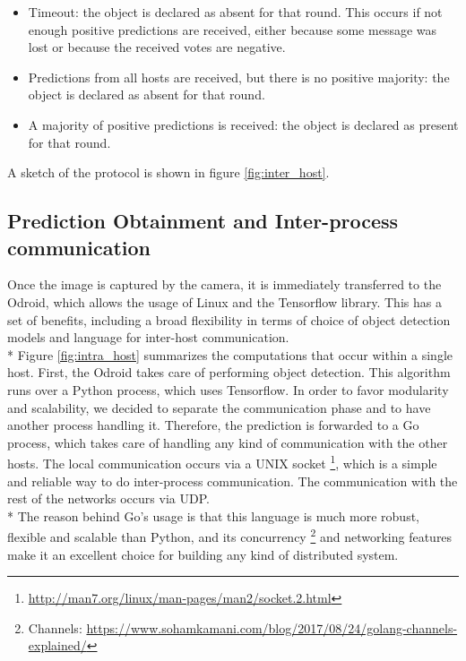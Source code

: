 \documentclass[10pt,conference,compsocconf]{IEEEtran}
\begin{document}
\begin{enumerate}
\begin{itemize}
\item Timeout: the object is declared as absent for that round. This occurs if not enough positive predictions are received, either because some message was lost or because the received votes are negative.
\item Predictions from all hosts are received, but there is no positive majority: the object is declared as absent for that round.
\item A majority of positive predictions is received: the object is declared as present for that round.
\end{itemize}
A sketch of the protocol is shown in figure \ref{fig:inter_host}.
\subsection{Prediction Obtainment and Inter-process communication}Once the image is captured by the camera, it is immediately transferred to the Odroid, which allows the usage of Linux and the Tensorflow library. This has a set of benefits, including a broad flexibility in terms of choice of object detection models and language for inter-host communication.\\*
Figure \ref{fig:intra_host} summarizes the computations that occur within a single host.
First, the Odroid takes care of performing object detection. This algorithm runs over a Python process, which uses Tensorflow. In order to favor modularity and scalability, we decided to separate the communication phase and to have another process handling it.
Therefore, the prediction is forwarded to a Go process, which takes care of handling any kind of communication with the other hosts. The local communication occurs via a UNIX socket \footnote{\url{http://man7.org/linux/man-pages/man2/socket.2.html}}, which is a simple and reliable way to do inter-process communication. The communication with the rest of the networks occurs via UDP.\\*
The reason behind Go's usage is that this language is much more robust, flexible and scalable than Python, and its concurrency \footnote{Channels: \url{https://www.sohamkamani.com/blog/2017/08/24/golang-channels-explained/}} and networking features make it an excellent choice for building any kind of distributed system.

\end{enumerate}
\end{document}
